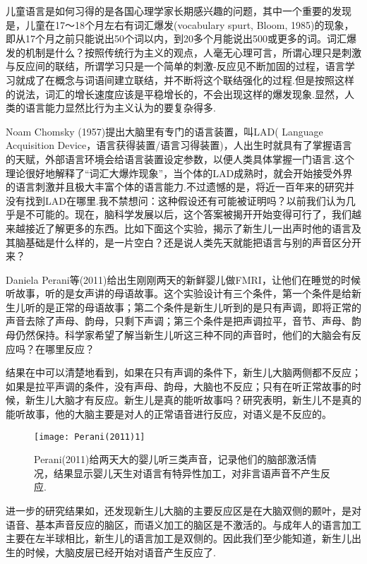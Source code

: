 儿童语言是如何习得的是各国心理学家长期感兴趣的问题，其中一个重要的发现是，儿童在17～18个月左右有词汇爆发(vocabulary spurt, Bloom, 1985)的现象，即从17个月之前只能说出50个词以内，到20多个月能说出500或更多的词。词汇爆发的机制是什么？按照传统行为主义的观点，人毫无心理可言，所谓心理只是刺激与反应间的联结，所谓学习只是一个简单的刺激-反应见不断加固的过程，语言学习就成了在概念与词语间建立联结，并不断将这个联结强化的过程.但是按照这样的说法，词汇的增长速度应该是平稳增长的，不会出现这样的爆发现象.显然，人类的语言能力显然比行为主义认为的要复杂得多.

Noam Chomsky (1957)提出大脑里有专门的语言装置，叫LAD( Language Acquisition Device，语言获得装置/语言习得装置)，人出生时就具有了掌握语言的天赋，外部语言环境会给语言装置设定参数，以便人类具体掌握一门语言.这个理论很好地解释了“词汇大爆炸现象”，当个体的LAD成熟时，就会开始接受外界的语言刺激并且极大丰富个体的语言能力.不过遗憾的是，将近一百年来的研究并没有找到LAD在哪里.我不禁想问：这种假设还有可能被证明吗？以前我们认为几乎是不可能的。现在，脑科学发展以后，这个答案被揭开开始变得可行了，我们越来越接近了解更多的东西。比如下面这个实验，揭示了新生儿一出声时他的语言及其脑基础是什么样的，是一片空白？还是说人类先天就能把语言与别的声音区分开来？

Daniela Perani等(2011)给出生刚刚两天的新鲜婴儿做FMRI，让他们在睡觉的时候听故事，听的是女声讲的母语故事。这个实验设计有三个条件，第一个条件是给新生儿听的是正常的母语故事；第二个条件是新生儿听到的是只有声调，即将正常的声音去除了声母、韵母，只剩下声调；第三个条件是把声调拉平，音节、声母、韵母仍然保持。科学家希望了解当新生儿听这三种不同的声音时，他们的大脑会有反应吗？在哪里反应？

结果在中可以清楚地看到，如果在只有声调的条件下，新生儿大脑两侧都不反应；如果是拉平声调的条件，没有声母、韵母，大脑也不反应；只有在听正常故事的时候，新生儿大脑才有反应。新生儿是真的能听故事吗？研究表明，新生儿不是真的能听故事，他的大脑主要是对人的正常语音进行反应，对语义是不反应的。

\begin{figure*}
	\texttt{[image: Perani(2011)1]}
	\caption[Perani(2011)1]{Perani(2011)给两天大的婴儿听三类声音，记录他们的脑部激活情况，结果显示婴儿天生对语言有特异性加工，对非言语声音不产生反应.}
\end{figure*}

进一步的研究结果如，还发现新生儿大脑的主要反应区是在大脑双侧的颞叶，是对语音、基本声音反应的脑区，而语义加工的脑区是不激活的。与成年人的语言加工主要在左半球相比，新生儿的语言加工是双侧的。因此我们至少能知道，新生儿出生的时候，大脑皮层已经开始对语音产生反应了.

